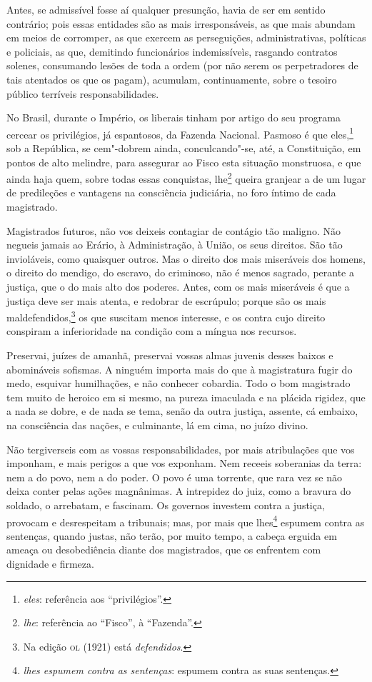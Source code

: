 Antes, se admissível fosse aí qualquer presunção, havia de ser em
sentido contrário; pois essas entidades são as mais irresponsáveis, as
que mais abundam em meios de corromper, as que exercem as perseguições,
administrativas, políticas e policiais, as que, demitindo funcionários
indemissíveìs, rasgando contratos solenes, consumando lesões de toda a
ordem (por não serem os perpetradores de tais atentados os que os
pagam), acumulam, continuamente, sobre o tesoiro público terríveis
responsabilidades.

No Brasil, durante o Império, os liberais tinham por artigo do seu
programa cercear os privilégios, já espantosos, da Fazenda Nacional.
Pasmoso é que eles,\footnote{ \textit{eles}: referência aos
“privilégios”.} sob a República, se cem"-dobrem ainda, conculcando"-se,
até, a Constituição, em pontos de alto melindre, para assegurar ao
Fisco esta situação monstruosa, e que ainda haja quem, sobre todas
essas conquistas, lhe\footnote{ \textit{lhe}: referência ao “Fisco”, à
“Fazenda”.} queira granjear a de um lugar de predileções e vantagens na
consciência judiciária, no foro íntimo de cada magistrado.

Magistrados futuros, não vos deixeis contagiar de contágio tão
maligno. Não negueis jamais ao Erário, à Administração, à União, os
seus direitos. São tão invioláveis, como quaisquer outros. Mas o
direito dos mais miseráveis dos homens, o direito do mendigo, do
escravo, do criminoso, não é menos sagrado, perante a justiça, que o do
mais alto dos poderes. Antes, com os mais miseráveis é que a justiça
deve ser mais atenta, e redobrar de escrúpulo; porque são os mais
maldefendidos,\footnote{ Na edição \textsc{ol} (1921) está \textit{defendidos}.}
os que suscitam menos interesse, e os contra cujo direito conspiram a
inferioridade na condição com a míngua nos recursos.

Preservai, juízes de amanhã, preservai vossas almas juvenis desses
baixos e abomináveis sofismas. A ninguém importa mais do que à
magistratura fugir do medo, esquivar humilhações, e não conhecer
cobardia. Todo o bom magistrado tem muito de heroico em si mesmo, na
pureza imaculada e na plácida rigidez, que a nada se dobre, e de nada
se tema, senão da outra justiça, assente, cá embaixo, na consciência
das nações, e culminante, lá em cima, no juízo divino.

Não tergiverseis com as vossas responsabilidades, por mais
atribulações que vos imponham, e mais perigos a que vos exponham. Nem
receeis soberanias da terra: nem a do povo, nem a do poder. O povo é
uma torrente, que rara vez se não deixa conter pelas ações magnânimas.
A intrepidez do juiz, como a bravura do soldado, o arrebatam, e
fascinam. Os governos investem contra a justiça, provocam e
desrespeitam a tribunais; mas, por mais que lhes\footnote{ \textit{lhes
espumem contra as sentenças}: espumem contra as suas sentenças.}
espumem contra as sentenças, quando justas, não terão, por muito tempo,
a cabeça erguida em ameaça ou desobediência diante dos magistrados, que
os enfrentem com dignidade e firmeza.

